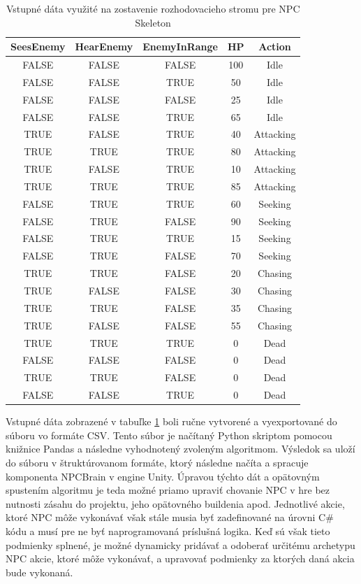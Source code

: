\documentclass[slovak, master]{diploma}
\begin{document}
\begin{table}[!ht]
    \centering
    \begin{tabular}{|c|c|c|c|c|}
    \hline
        \textbf{SeesEnemy} & \textbf{HearEnemy} & \textbf{EnemyInRange} & \textbf{HP} & \textbf{Action} \\ \hline
        FALSE & FALSE & FALSE & 100 & Idle \\ 
        FALSE & FALSE & TRUE & 50 & Idle \\ 
        FALSE & FALSE & FALSE & 25 & Idle \\ 
        FALSE & FALSE & TRUE & 65 & Idle \\ 
        TRUE & FALSE & TRUE & 40 & Attacking \\ 
        TRUE & TRUE & TRUE & 80 & Attacking \\ 
        TRUE & FALSE & TRUE & 10 & Attacking \\ 
        TRUE & TRUE & TRUE & 85 & Attacking \\ 
        FALSE & TRUE & TRUE & 60 & Seeking \\ 
        FALSE & TRUE & FALSE & 90 & Seeking \\ 
        FALSE & TRUE & TRUE & 15 & Seeking \\ 
        FALSE & TRUE & FALSE & 70 & Seeking \\ 
        TRUE & TRUE & FALSE & 20 & Chasing \\ 
        TRUE & FALSE & FALSE & 30 & Chasing \\ 
        TRUE & TRUE & FALSE & 35 & Chasing \\ 
        TRUE & FALSE & FALSE & 55 & Chasing \\ 
        TRUE & TRUE & TRUE & 0 & Dead \\ 
        FALSE & FALSE & FALSE & 0 & Dead \\ 
        TRUE & TRUE & FALSE & 0 & Dead \\ 
        FALSE & FALSE & TRUE & 0 & Dead \\ \hline
    \end{tabular}
    \caption{Vstupné dáta využité na zostavenie rozhodovacieho stromu pre NPC Skeleton}
    \label{tab:skeletonActionRaw}
\end{table}

Vstupné dáta zobrazené v tabuľke \ref{tab:skeletonActionRaw} boli ručne vytvorené a vyexportované do súboru vo formáte CSV. Tento súbor je načítaný Python skriptom pomocou knižnice Pandas a následne vyhodnotený zvoleným algoritmom. Výsledok sa uloží do súboru v štruktúrovanom formáte, ktorý následne načíta a spracuje komponenta NPCBrain v engine Unity. Úpravou týchto dát a opätovným spustením algoritmu je teda možné priamo upraviť chovanie NPC v hre bez nutnosti zásahu do projektu, jeho opätovného buildenia apod. Jednotlivé akcie, ktoré NPC môže vykonávať však stále musia byť zadefinované na úrovni C\# kódu a musí pre ne byť naprogramovaná príslušná logika. Keď sú však tieto podmienky splnené, je možné dynamicky pridávať a odoberať určitému archetypu NPC akcie, ktoré môže vykonávať, a upravovať podmienky za ktorých daná akcia bude vykonaná. 
\end{document}
